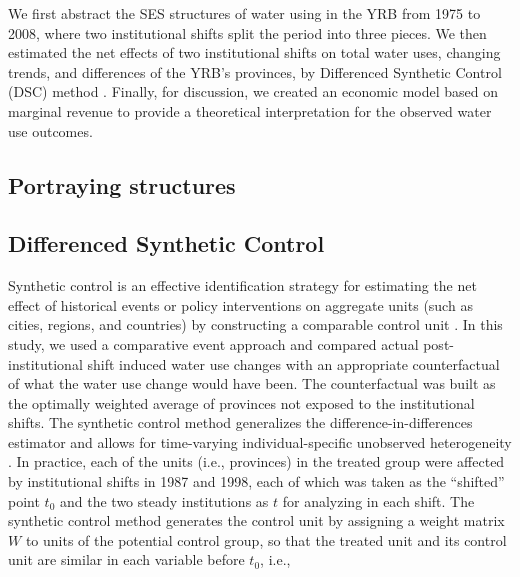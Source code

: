 
We first abstract the SES structures of water using in the YRB from 1975 to 2008, where two institutional shifts split the period into three pieces. We then estimated the net effects of two institutional shifts on total water uses, changing trends, and differences of the YRB's provinces, by Differenced Synthetic Control (DSC) method \cite{arkhangelsky2019}. Finally, for discussion, we created an economic model based on marginal revenue to provide a theoretical interpretation for the observed water use outcomes.

\subsection{Portraying structures}

\subsection{Differenced Synthetic Control}
Synthetic control is an effective identification strategy for estimating the net effect of historical events or policy interventions on aggregate units (such as cities, regions, and countries) by constructing a comparable control unit \cite{abadie2010, abadie2015, hill2021}.
In this study, we used a comparative event approach and compared actual post-institutional shift induced water use changes with an appropriate counterfactual of what the water use change would have been.
The counterfactual was built as the optimally weighted average of provinces not exposed to the institutional shifts.
The synthetic control method generalizes the difference-in-differences estimator and allows for time-varying individual-specific unobserved heterogeneity \cite{billmeier2013, smith2015}.
In practice, each of the units (i.e., provinces) in the treated group were affected by institutional shifts in 1987 and 1998, each of which was taken as the “shifted” point $t_0$ and the two steady institutions as $t$ for analyzing in each shift. The synthetic control method generates the control unit by assigning a weight matrix $W$ to units of the potential control group, so that the treated unit and its control unit are similar in each variable before $t_0$, i.e.,

